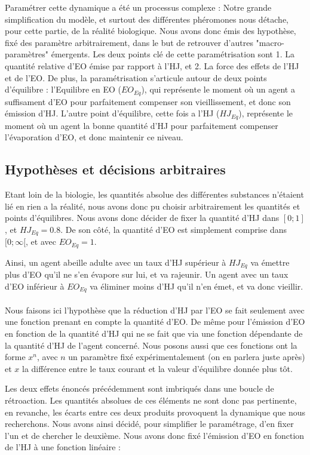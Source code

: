 	Paramétrer cette dynamique a été un processus complexe : Notre grande simplification du modèle, et surtout des différentes phéromones nous détache, pour cette partie, de la réalité biologique. Nous avons donc émis des hypothèse, fixé des paramètre arbitrairement, dans le but de retrouver d'autres "macro-paramètres" émergents. Les deux points clé de cette paramétrisation sont 1. La quantité relative d'EO émise par rapport à l'HJ, et 2. La force des effets de l'HJ et de l'EO. De plus, la paramétrisation s'articule autour de deux points d'équilibre : l'Equilibre en EO ($EO_{Eq}$), qui représente le moment où un agent a suffisament d'EO pour parfaitement compenser son vieillissement, et donc son émission d'HJ. L'autre point d'équilibre, cette fois a l'HJ ($HJ_{Eq}$), représente le moment où un agent la bonne quantité d'HJ pour parfaitement compenser l'évaporation d'EO, et donc maintenir ce niveau.
	
	\subsection{Hypothèses et décisions arbitraires}
	Etant loin de la biologie, les quantités absolue des différentes substances n'étaient lié en rien a la réalité, nous avons donc pu choisir arbitrairement les quantités et points d'équilibres. Nous avons donc décider de fixer la quantité d'HJ dans $[0;1]$, et $HJ_{Eq} = 0.8$. De son côté, la quantité d'EO est simplement comprise dans $[0;\infty[$, et avec $EO_{Eq} = 1$. 
	
	Ainsi, un agent abeille adulte avec un taux d'HJ supérieur à $HJ_{Eq}$ va émettre plus d'EO qu'il ne s'en évapore sur lui, et va rajeunir. Un agent avec un taux d'EO inférieur à $EO_{Eq}$ va éliminer moins d'HJ qu'il n'en émet, et va donc vieillir.
	
	\paragraph{}
	Nous faisons ici l'hypothèse que la réduction d'HJ par l'EO se fait seulement avec une fonction prenant en compte la quantité d'EO. De même pour l'émission d'EO en fonction de la quantité d'HJ qui ne se fait que via une fonction dépendante de la quantité d'HJ de l'agent concerné. Nous posons aussi que ces fonctions ont la forme $x^n$, avec $n$ un paramètre fixé expérimentalement (on en parlera juste après) et $x$ la différence entre le taux courant et la valeur d'équilibre donnée plus tôt.
	
	Les deux effets énoncés précédemment sont imbriqués dans une boucle de rétroaction. Les quantités absolues de ces éléments ne sont donc pas pertinente, en revanche, les écarts entre ces deux produits provoquent la dynamique que nous recherchons. Nous avons ainsi décidé, pour simplifier le paramétrage, d'en fixer l'un et de chercher le deuxième. Nous avons donc fixé l'émission d'EO en fonction de l'HJ à une fonction linéaire :
	
